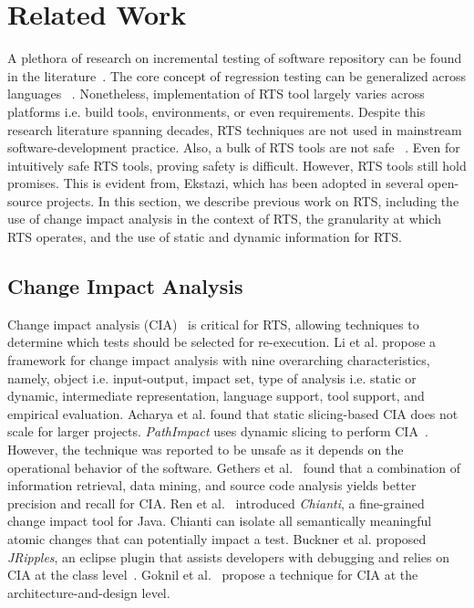 \chapter{Related Work}
\label{sec:related}

A plethora of research on incremental testing of software repository can be found in the literature~\cite{leung1989insights,b34,b35, rothermel2000regression}. The core concept of regression testing can be generalized across languages ~\cite{harrold2001regression,b34}. 
Nonetheless, implementation of RTS tool largely varies across platforms i.e. build tools, environments, or even requirements. 
Despite this research literature spanning decades, RTS techniques are not used in mainstream software-development practice. Also, a bulk of RTS tools are not safe ~\cite{b35}. Even for intuitively safe RTS tools, proving safety is difficult. However, RTS tools still hold promises. This is evident from, Ekstazi, which has been adopted in several open-source projects. 
In this section, we describe previous work on RTS, including the use of change impact analysis in the context of RTS, the granularity at which RTS operates, and the use of static and dynamic information for RTS.

\section{Change Impact Analysis}
Change impact analysis (CIA)~\cite{b28} is critical for RTS, allowing techniques to determine which tests should be selected for re-execution. 
Li et al. propose a framework for change impact analysis with nine overarching characteristics, namely, object i.e. input-output, impact set, type of analysis i.e. static or dynamic, intermediate representation, language support, tool support, and empirical evaluation. 
Acharya et al. \cite{acharya2011practical} found that static slicing-based CIA does not scale for larger projects. \textit{PathImpact} uses dynamic slicing to perform CIA~\cite{law2003whole}. However, the technique was reported to be unsafe as it depends on the operational behavior of the software. Gethers et al.~\cite{b32} found that a combination of information retrieval, data mining, and source code analysis yields better precision and recall for CIA. Ren et al.~\cite{ren2004chianti} introduced \textit{Chianti}, a fine-grained change impact tool for Java. Chianti can isolate all semantically meaningful atomic changes that can potentially impact a test.  Buckner et al. proposed \textit{JRipples}, an eclipse plugin that assists developers with debugging and relies on CIA at the class level~\cite{buckner2005jripples}. Goknil et al.~\cite{b31} propose a technique for CIA at the architecture-and-design level.


